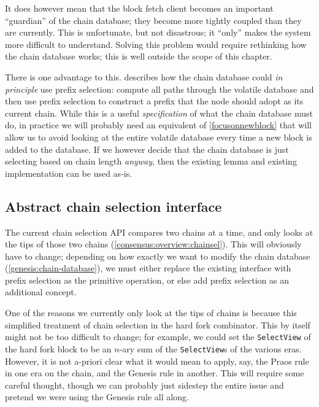 It does however mean that the block fetch client becomes an important
``guardian'' of the chain database; they become more tightly coupled than they
are currently. This is unfortunate, but not disastrous; it ``only'' makes the
system more difficult to understand. Solving this problem would require
rethinking how the chain database works; this is well outside the scope of this
chapter.

There is one advantage to this.   describes how
the chain database could \emph{in principle} use prefix selection: compute all
paths through the volatile database and then use prefix selection to construct a
prefix that the node should adopt as its current chain. While this is a useful
\emph{specification} of what the chain database must do, in practice we will
probably need an equivalent of \cref{focusonnewblock} that will allow us to
avoid looking at the entire volatile database every time a new block is added to
the database. If we however decide that the chain database is just selecting
based on chain length \emph{anyway}, then the existing lemma and existing
implementation can be used as-is.

\subsection{Abstract chain selection interface}

The current chain selection API compares two chains at a time, and only looks at
the tips of those two chains (\cref{consensus:overview:chainsel}). This will
obviously have to change; depending on how exactly we want to modify the chain
database (\cref{genesis:chain-database}), we must either replace the existing
interface with prefix selection as the primitive operation, or else add prefix
selection as an additional concept.

One of the reasons we currently only look at the tips of chains is because this
simplified treatment of chain selection in the hard fork combinator. This by
itself might not be too difficult to change; for example, we could set the
\lstinline!SelectView! of the hard fork block to be an $n$-ary sum of the
\lstinline!SelectView!s of the various eras. However, it is not a-priori clear
what it would mean to apply, say, the Praos rule in one era on the chain,
and the Genesis rule in another. This will require some careful thought,
though we can probably just sidestep the entire issue and pretend we were
using the Genesis rule all along.

